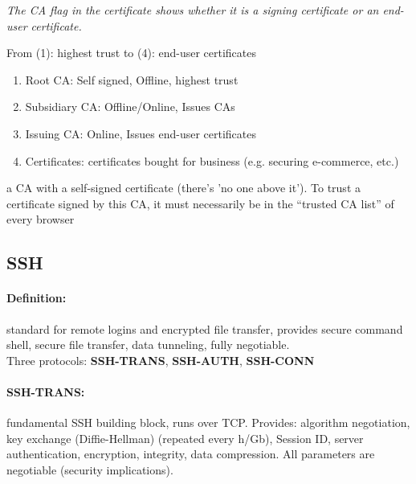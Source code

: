 \textit{The CA flag in the certificate shows whether it is a signing certificate or an end-user certificate.}

 From (1): highest trust to (4): end-user certificates
\begin{enumerate}
\item Root CA: Self signed, Offline, highest trust
\item Subsidiary CA: Offline/Online, Issues CAs
\item Issuing CA: Online, Issues end-user certificates
\item Certificates: certificates bought for business (e.g. securing e-commerce, etc.)
\end{enumerate}


 a CA with a self-signed certificate (there's 'no one above it'). To trust a certificate signed by this CA, it must necessarily be in the ``trusted CA list'' of every browser

\subsection{SSH}

\paragraph{Definition:} standard for remote logins and encrypted file transfer, provides secure command shell, secure file transfer, data tunneling, fully negotiable. 
\\Three protocols: \textbf{SSH-TRANS}, \textbf{SSH-AUTH}, \textbf{SSH-CONN}

\paragraph{SSH-TRANS:} fundamental SSH building block, runs over TCP. Provides: algorithm negotiation, key exchange (Diffie-Hellman) (repeated every h/Gb), Session ID, server authentication, encryption, integrity, data compression. All parameters are negotiable (security implications).

